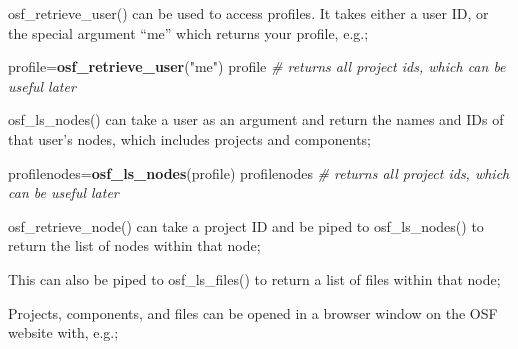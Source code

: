 \documentclass[]{article}
\newenvironment{Shaded}{\begin{snugshade}}{\end{snugshade}}
\newcommand{\KeywordTok}[1]{\textcolor[rgb]{0.13,0.29,0.53}{\textbf{#1}}}
\newcommand{\StringTok}[1]{\textcolor[rgb]{0.31,0.60,0.02}{#1}}
\newcommand{\CommentTok}[1]{\textcolor[rgb]{0.56,0.35,0.01}{\textit{#1}}}
\newcommand{\OperatorTok}[1]{\textcolor[rgb]{0.81,0.36,0.00}{\textbf{#1}}}
\newcommand{\NormalTok}[1]{#1}
\begin{document}
osf\_retrieve\_user() can be used to access profiles. It takes either a
user ID, or the special argument ``me'' which returns your profile,
e.g.;

\begin{Shaded}
\begin{Highlighting}[]
\NormalTok{profile=}\KeywordTok{osf_retrieve_user}\NormalTok{(}\StringTok{"me"}\NormalTok{)}
\NormalTok{profile }\CommentTok{# returns all project ids, which can be useful later}
\end{Highlighting}
\end{Shaded}

osf\_ls\_nodes() can take a user as an argument and return the names and
IDs of that user's nodes, which includes projects and components;

\begin{Shaded}
\begin{Highlighting}[]
\NormalTok{profilenodes=}\KeywordTok{osf_ls_nodes}\NormalTok{(profile)}
\NormalTok{profilenodes }\CommentTok{# returns all project ids, which can be useful later}
\end{Highlighting}
\end{Shaded}

osf\_retrieve\_node() can take a project ID and be piped to
osf\_ls\_nodes() to return the list of nodes within that node;

\begin{Shaded}
\end{Shaded}

This can also be piped to osf\_ls\_files() to return a list of files
within that node;

\begin{Shaded}
\end{Shaded}

Projects, components, and files can be opened in a browser window on the
OSF website with, e.g.;

\begin{Shaded}
\end{Shaded}
\end{document}
